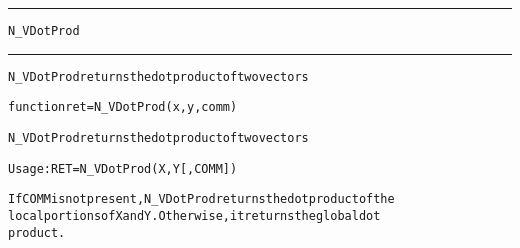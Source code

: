 \begin{samepage}
\hrule
\begin{center}
{\large \verb!N_VDotProd!}
\label{p:N_VDotProd}
\end{center}
\hrule\vspace{0.1in}



\begin{alltt}
N_VDotProd returns the dot product of two vectors
\end{alltt}

\end{samepage}



\begin{samepage}


\begin{alltt}
function ret = N_VDotProd(x,y,comm) 
\end{alltt}

\end{samepage}



\begin{alltt}
N_VDotProd returns the dot product of two vectors

   Usage:  RET = N_VDotProd ( X, Y [, COMM] )

If COMM is not present, N_VDotProd returns the dot product of the
local portions of X and Y. Otherwise, it returns the global dot
product.
\end{alltt}





 



\vspace{0.1in}